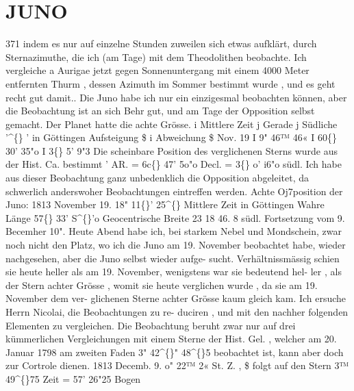 \documentclass[12pt,a4paper]{article}
\newcommand{\degree}{\textdegree}
\begin{document}
\section*{JUNO}
371 
indem  es  nur  auf  einzelne  Stunden  zuweilen  sich  etwas  aufklärt,  durch  Sternazimuthe,  die  ich  (am  Tage) 
mit  dem  Theodolithen  beobachte.  Ich  vergleiche  a  Aurigae  jetzt  gegen  Sonnenuntergang  mit  einem 
4000  Meter  entfernten  Thurm ,  dessen  Azimuth  im  Sommer  bestimmt  wurde ,  und  es  geht  recht  gut  damit.. 
Die  Juno  habe  ich  nur  ein  einzigesmal  beobachten  können,  aber  die  Beobachtung  ist  an  sich 
Behr  gut,  und  am  Tage  der  Opposition  selbst  gemacht.     Der  Planet  hatte  die  achte  Grösse. 
i  Mittlere  Zeit   j  Gerade         j      Südliche 
'\textasciicircum\{\}       '  in  Göttingen       Aufsteigung  \$  i  Abweichung  \$ 
Nov.  19     I     
9"  46™  46«      I     
60\degree\{\}   30'   35"o     I     3\degree\{\}   5'    9"3 
Die  scheinbare  Position  des  verglichenen  Sterns  wurde  aus  der  Hist.  Ca.  bestimmt  ' 
AR.  =  6c\degree\{\}  47'  5o"o      Decl.  =  3\degree\{\}  o'  i6"o  südl. 
Ich  habe  aus  dieser  Beobachtung    ganz   unbedenklich    die   Opposition    abgeleitet,    da  schwerlich 
anderswoher  Beobachtungen  eintreffen  werden. 
Achte  Oj7position  der  Juno: 
1813  November  19.  18"  11\degree\{\}'  25\textasciicircum\{\}  Mittlere  Zeit  in  Göttingen 
Wahre  Länge   
57\degree\{\}  33'   S\textasciicircum\{\}'o 
Geocentrische  Breite   
23    18    46.  8  südl. 
Fortsetzung  vom  9.  Becemher  10". 
Heute  Abend  habe  ich,  bei  starkem  Nebel  und  Mondschein,  zwar  noch  nicht  den  Platz,  wo  ich 
die  Juno  am  19.  November  beobachtet  habe,  wieder  nachgesehen,  aber  die  Juno  selbst  wieder  aufge- 
sucht. Verhältnissmässig  schien  sie  heute  heller  als  am  19.  November,  wenigstens  war  sie  bedeutend  hel- 
ler ,  als  der  Stern  achter  Grösse ,  womit  sie  heute  verglichen  wurde ,  da  sie  am  19.  November  dem  ver- 
glichenen Sterne  achter  Grösse  kaum  gleich  kam.  Ich  ersuche  Herrn  Nicolai,  die  Beobachtungen  zu  re- 
duciren ,  und  mit  den  nachher  folgenden  Elementen  zu  vergleichen.  Die  Beobachtung  beruht  zwar  nur 
auf  drei  kümmerlichen  Vergleichungen  mit  einem  Sterne  der  Hist.  Gel. ,  welcher  am  20.  Januar  1798  am 
zweiten  Faden  3"  42\textasciicircum\{\}"  48\textasciicircum\{\}5  beobachtet  ist,  kann  aber  doch  zur  Cortrole  dienen. 
1813  Decemb.  9.  o"  22™  2«  St.  Z. ,    \$  folgt  auf  den  Stern  3™  49\textasciicircum\{\}75   Zeit  =  57'  26"25  Bogen 
\end{document}
